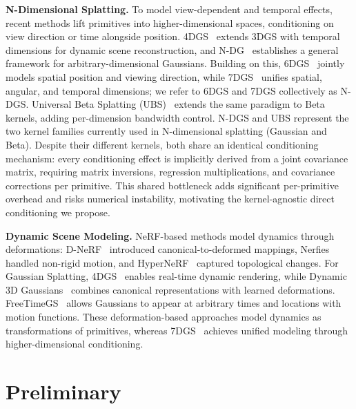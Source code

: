 \documentclass{article}
\theoremstyle{plain}
\theoremstyle{definition}
\theoremstyle{remark}
\begin{document}
\textbf{N-Dimensional Splatting.}
To model view-dependent and temporal effects, recent methods lift primitives into higher-dimensional spaces, conditioning on view direction or time alongside position. 4DGS~\cite{yang2023real} extends 3DGS with temporal dimensions for dynamic scene reconstruction, and N-DG~\cite{diolatzis2024n} establishes a general framework for arbitrary-dimensional Gaussians. Building on this, 6DGS~\cite{gao20246dgs} jointly models spatial position and viewing direction, while 7DGS~\cite{gao20257dgs} unifies spatial, angular, and temporal dimensions; we refer to 6DGS and 7DGS collectively as N-DGS. Universal Beta Splatting (UBS)~\citep{liu2025universal} extends the same paradigm to Beta kernels, adding per-dimension bandwidth control. N-DGS and UBS represent the two kernel families currently used in N-dimensional splatting (Gaussian and Beta). Despite their different kernels, both share an identical conditioning mechanism: every conditioning effect is implicitly derived from a joint covariance matrix, requiring matrix inversions, regression multiplications, and covariance corrections per primitive. This shared bottleneck adds significant per-primitive overhead and risks numerical instability, motivating the kernel-agnostic direct conditioning we propose.

\textbf{Dynamic Scene Modeling.}
NeRF-based methods model dynamics through deformations: D-NeRF~\cite{pumarola2020dnerfneuralradiancefields} introduced canonical-to-deformed mappings, Nerfies~\cite{park2021nerfies} handled non-rigid motion, and HyperNeRF~\cite{park2021hypernerf} captured topological changes. For Gaussian Splatting, 4DGS~\cite{yang2023real} enables real-time dynamic rendering, while Dynamic 3D Gaussians~\cite{luiten2023dynamic} combines canonical representations with learned deformations. FreeTimeGS~\cite{wang2025freetimegs} allows Gaussians to appear at arbitrary times and locations with motion functions. These deformation-based approaches model dynamics as transformations of primitives, whereas 7DGS~\cite{gao20257dgs} achieves unified modeling through higher-dimensional conditioning.


\section{Preliminary}

\end{document}

